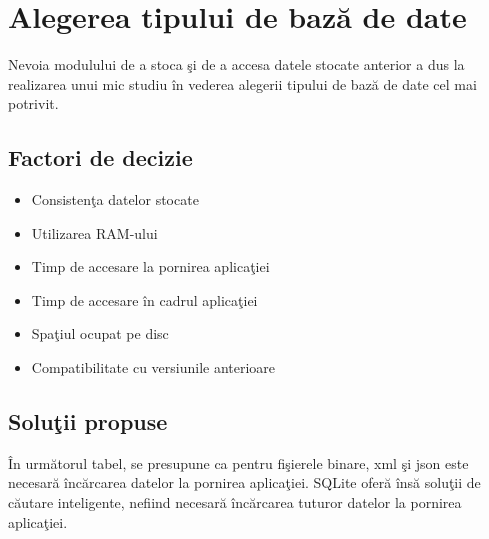 \label{cap2}


\label{Chapter2} %

\thispagestyle{fancy}

\section{Alegerea tipului de bază de date} 
	Nevoia modulului de a stoca şi de a accesa datele stocate anterior a dus la realizarea unui mic studiu în vederea alegerii tipului de bază de date cel mai potrivit.

	\subsection{Factori de decizie} 
	\begin{itemize}
	 \setlength\itemsep{0em}
		\item Consistenţa datelor stocate
		\item Utilizarea RAM-ului
		\item Timp de accesare la pornirea aplicaţiei
		\item Timp de accesare în cadrul aplicaţiei
		\item Spaţiul ocupat pe disc
		\item Compatibilitate cu versiunile anterioare
	\end{itemize}

	\subsection{Soluţii propuse}
	În următorul tabel, se presupune ca pentru fişierele binare, \acrshort{xml}  şi \acrshort{json}  este necesară încărcarea datelor la pornirea aplicaţiei. SQLite oferă însă soluţii de căutare inteligente, nefiind necesară încărcarea tuturor datelor la pornirea aplicaţiei.

